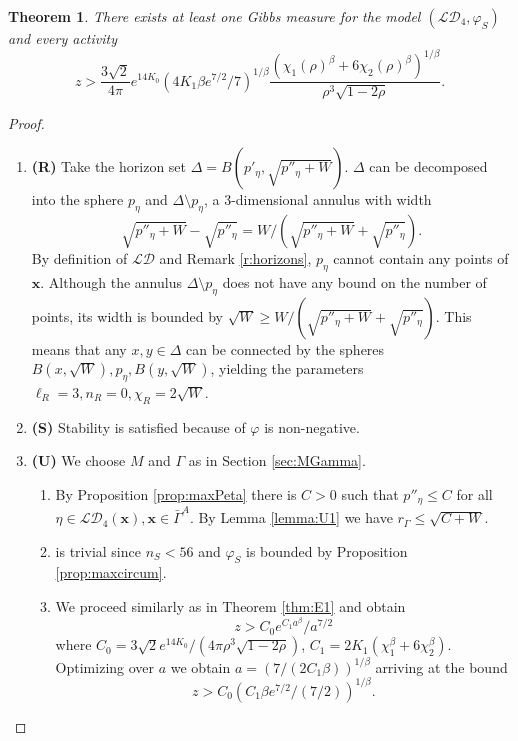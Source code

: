 \documentclass{kybernetika}
\newtheorem{theorem}{Theorem}[section]
\newcommand{\x}{{\mathbf{x}}}
\begin{document}
\begin{theorem}\label{thm:E3}
	There exists at least one Gibbs measure for the model $(\mathcal {LD}_4,\varphi_S)$ and every activity 
	$$z> \frac{3\sqrt 2}{4\pi}e^{14 K_0}   (4K_1 \beta e^{7/2}/7)^{1/\beta} \frac{(\chi_1(\rho)^\beta + 6\chi_2(\rho)^\beta)^{1/\beta}}{\rho^3 \sqrt{1-2\rho}}.$$
\end{theorem}
\begin{proof}
\begin{enumerate}[]
	\item \textbf{(R)} Take the horizon set $\Delta = B(p'_\eta, \sqrt{p''_\eta + W})$. $\Delta$ can be decomposed into the sphere $p_\eta$ and $\Delta \setminus p_\eta$, a 3-dimensional annulus with width 
		$$\sqrt{p''_\eta+W} -\sqrt{p''_\eta}=W/(\sqrt{p''_\eta+W} + \sqrt{p''_\eta}).$$
		By definition of $\mathcal {LD}$ and Remark \ref{r:horizons}, $p_\eta$  cannot contain any points of $\x$. Although the annulus $\Delta \setminus p_\eta$ does not have any bound on the number of points, its width is bounded by $\sqrt W \geq  W/(\sqrt{p''_\eta+W} + \sqrt{p''_\eta})$. This means that any $x,y\in \Delta$ can be connected by the spheres $B(x,\sqrt W), p_\eta, B(y,\sqrt W)$, yielding the parameters $\ell_R = 3,n_R=0,\chi_R=2\sqrt W$.
	\item \textbf{(S)} Stability is satisfied because of $\varphi$ is non-negative.
	\item \textbf{(U)} We choose $M$ and $\Gamma$ as in Section \ref{sec:MGamma}.
		\begin{enumerate}[(U1)]
			\item By Proposition \ref{prop:maxPeta} there is $C>0$ such that $p''_\eta\leq C$ for all $\eta \in \mathcal {LD}_4(\x), \x \in \bar\Gamma^A$. By Lemma \ref{lemma:U1} we have $r_\Gamma\leq \sqrt{C + W}$.
			\item is trivial since $n_S<56$ and $\varphi_{S}$ is bounded by Proposition \ref{prop:maxcircum}.
			\item We proceed similarly as in Theorem \ref{thm:E1} and obtain
				$$z>C_0 e^{C_1 a^\beta} / a^{7/2}$$
				where $C_0=3 \sqrt 2 e^{14K_0} / (4\pi \rho^3 \sqrt{1-2\rho})$, $C_1 = 2K_1(\chi_1^\beta + 6\chi_2^\beta)$. Optimizing over $a$ we obtain $a=(7/(2C_1\beta))^{1/\beta}$ arriving at the bound
				$$z> C_0 (C_1 \beta e^{7/2} / (7/2))^{1/\beta}.$$
		\end{enumerate}
\end{enumerate}
\end{proof}
\end{document}
